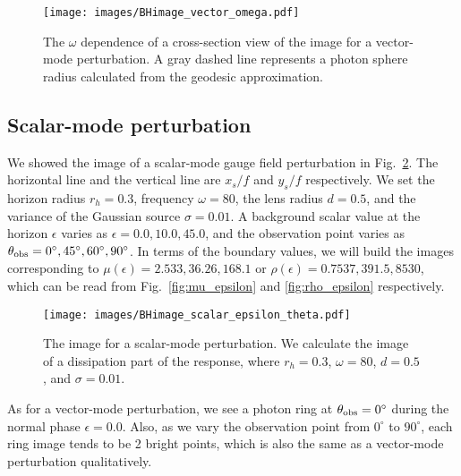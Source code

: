 \documentclass[a4paper,11pt]{article}
\begin{document}
    
\begin{figure}
    \centering
    \texttt{[image: images/BHimage\_vector\_omega.pdf]}
     \caption{The $\omega$ dependence of a cross-section view of the image for a vector-mode perturbation. A gray dashed line represents a photon sphere radius calculated from the geodesic approximation.}
        \label{fig:BHimage_vector_omega}
\end{figure}




\subsection{Scalar-mode perturbation}

    We showed the image of a scalar-mode gauge field perturbation in Fig.~\ref{fig:BHimage_scalar_Im}. The horizontal line and the vertical line are $x_s/f$ and $y_s/f$ respectively. We set the horizon radius $r_h=0.3$, frequency $\omega=80$, the lens radius $d=0.5$, and the variance of the Gaussian source $\sigma=0.01$. A background scalar value at the horizon $\epsilon$ varies as $\epsilon=0.0,10.0,45.0$, and the observation point varies as $\theta_{\rm{obs}}=0^\circ,45^\circ,60^\circ,90^\circ$. 
    In terms of the boundary values, we will build the images corresponding to $\mu(\epsilon)=2.533, 36.26, 168.1$ or $\rho(\epsilon)=0.7537, 391.5 ,8530$, which can be read from Fig.~\ref{fig:mu_epsilon} and \ref{fig:rho_epsilon} respectively.


\begin{figure}
    \centering
    \texttt{[image: images/BHimage\_scalar\_epsilon\_theta.pdf]}
    \caption{The image for a scalar-mode perturbation. We calculate the image of a dissipation part of the response, where $r_h=0.3$, $\omega=80$, $d=0.5$, and $\sigma=0.01$.}
    \label{fig:BHimage_scalar_Im}
\end{figure}

    As for a vector-mode perturbation, we see a photon ring at $\theta_{\rm{obs}}=0^\circ$ during the normal phase $\epsilon=0.0$. Also, as we vary the observation point from $0^\circ$ to $90^\circ$, each ring image tends to be 2 bright points, which is also the same as a vector-mode perturbation qualitatively.
    
\end{document}

